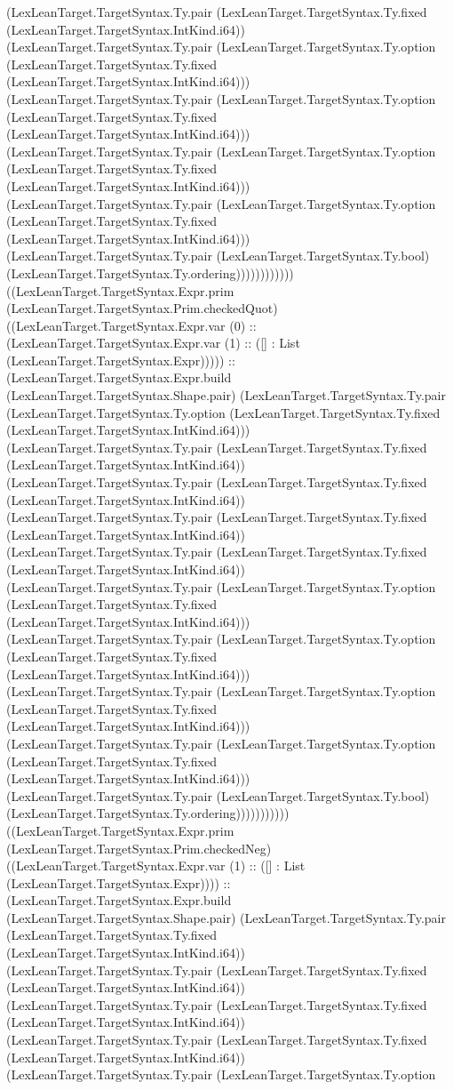\documentclass[11pt]{article}
\begin{document}
(LexLeanTarget.TargetSyntax.Ty.pair (LexLeanTarget.TargetSyntax.Ty.fixed (LexLeanTarget.TargetSyntax.IntKind.i64)) (LexLeanTarget.TargetSyntax.Ty.pair (LexLeanTarget.TargetSyntax.Ty.option (LexLeanTarget.TargetSyntax.Ty.fixed (LexLeanTarget.TargetSyntax.IntKind.i64))) (LexLeanTarget.TargetSyntax.Ty.pair (LexLeanTarget.TargetSyntax.Ty.option (LexLeanTarget.TargetSyntax.Ty.fixed (LexLeanTarget.TargetSyntax.IntKind.i64))) (LexLeanTarget.TargetSyntax.Ty.pair (LexLeanTarget.TargetSyntax.Ty.option (LexLeanTarget.TargetSyntax.Ty.fixed (LexLeanTarget.TargetSyntax.IntKind.i64))) (LexLeanTarget.TargetSyntax.Ty.pair (LexLeanTarget.TargetSyntax.Ty.option (LexLeanTarget.TargetSyntax.Ty.fixed (LexLeanTarget.TargetSyntax.IntKind.i64))) (LexLeanTarget.TargetSyntax.Ty.pair (LexLeanTarget.TargetSyntax.Ty.bool) (LexLeanTarget.TargetSyntax.Ty.ordering)))))))))))) ((LexLeanTarget.TargetSyntax.Expr.prim (LexLeanTarget.TargetSyntax.Prim.checkedQuot) ((LexLeanTarget.TargetSyntax.Expr.var (0) :: (LexLeanTarget.TargetSyntax.Expr.var (1) :: ([] : List (LexLeanTarget.TargetSyntax.Expr))))) :: (LexLeanTarget.TargetSyntax.Expr.build (LexLeanTarget.TargetSyntax.Shape.pair) (LexLeanTarget.TargetSyntax.Ty.pair (LexLeanTarget.TargetSyntax.Ty.option (LexLeanTarget.TargetSyntax.Ty.fixed (LexLeanTarget.TargetSyntax.IntKind.i64))) (LexLeanTarget.TargetSyntax.Ty.pair (LexLeanTarget.TargetSyntax.Ty.fixed (LexLeanTarget.TargetSyntax.IntKind.i64)) (LexLeanTarget.TargetSyntax.Ty.pair (LexLeanTarget.TargetSyntax.Ty.fixed (LexLeanTarget.TargetSyntax.IntKind.i64)) (LexLeanTarget.TargetSyntax.Ty.pair (LexLeanTarget.TargetSyntax.Ty.fixed (LexLeanTarget.TargetSyntax.IntKind.i64)) (LexLeanTarget.TargetSyntax.Ty.pair (LexLeanTarget.TargetSyntax.Ty.fixed (LexLeanTarget.TargetSyntax.IntKind.i64)) (LexLeanTarget.TargetSyntax.Ty.pair (LexLeanTarget.TargetSyntax.Ty.option (LexLeanTarget.TargetSyntax.Ty.fixed (LexLeanTarget.TargetSyntax.IntKind.i64))) (LexLeanTarget.TargetSyntax.Ty.pair (LexLeanTarget.TargetSyntax.Ty.option (LexLeanTarget.TargetSyntax.Ty.fixed (LexLeanTarget.TargetSyntax.IntKind.i64))) (LexLeanTarget.TargetSyntax.Ty.pair (LexLeanTarget.TargetSyntax.Ty.option (LexLeanTarget.TargetSyntax.Ty.fixed (LexLeanTarget.TargetSyntax.IntKind.i64))) (LexLeanTarget.TargetSyntax.Ty.pair (LexLeanTarget.TargetSyntax.Ty.option (LexLeanTarget.TargetSyntax.Ty.fixed (LexLeanTarget.TargetSyntax.IntKind.i64))) (LexLeanTarget.TargetSyntax.Ty.pair (LexLeanTarget.TargetSyntax.Ty.bool) (LexLeanTarget.TargetSyntax.Ty.ordering))))))))))) ((LexLeanTarget.TargetSyntax.Expr.prim (LexLeanTarget.TargetSyntax.Prim.checkedNeg) ((LexLeanTarget.TargetSyntax.Expr.var (1) :: ([] : List (LexLeanTarget.TargetSyntax.Expr)))) :: (LexLeanTarget.TargetSyntax.Expr.build (LexLeanTarget.TargetSyntax.Shape.pair) (LexLeanTarget.TargetSyntax.Ty.pair (LexLeanTarget.TargetSyntax.Ty.fixed (LexLeanTarget.TargetSyntax.IntKind.i64)) (LexLeanTarget.TargetSyntax.Ty.pair (LexLeanTarget.TargetSyntax.Ty.fixed (LexLeanTarget.TargetSyntax.IntKind.i64)) (LexLeanTarget.TargetSyntax.Ty.pair (LexLeanTarget.TargetSyntax.Ty.fixed (LexLeanTarget.TargetSyntax.IntKind.i64)) (LexLeanTarget.TargetSyntax.Ty.pair (LexLeanTarget.TargetSyntax.Ty.fixed (LexLeanTarget.TargetSyntax.IntKind.i64)) (LexLeanTarget.TargetSyntax.Ty.pair (LexLeanTarget.TargetSyntax.Ty.option 
\end{document}
